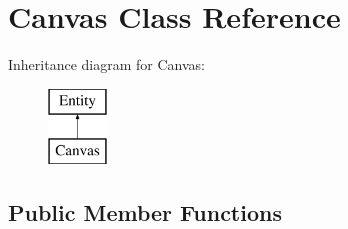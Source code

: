 \hypertarget{class_canvas}{}\section{Canvas Class Reference}
\label{class_canvas}
Inheritance diagram for Canvas\+:\begin{figure}[H]
\begin{center}
\leavevmode
\includegraphics[height=2.000000cm]{class_canvas}
\end{center}
\end{figure}
\subsection*{Public Member Functions}
